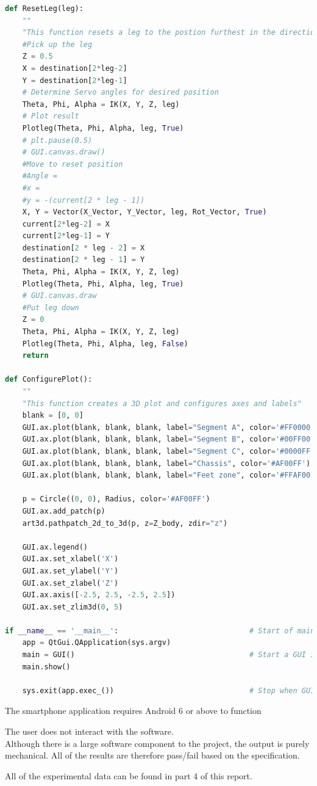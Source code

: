 \begin{lstlisting}[language = python]
def ResetLeg(leg):
    ""
    "This function resets a leg to the postion furthest in the direction of robot movement"
    #Pick up the leg
    Z = 0.5
    X = destination[2*leg-2]
    Y = destination[2*leg-1]
    # Determine Servo angles for desired position
    Theta, Phi, Alpha = IK(X, Y, Z, leg)
    # Plot result
    Plotleg(Theta, Phi, Alpha, leg, True)
    # plt.pause(0.5)
    # GUI.canvas.draw()
    #Move to reset position
    #Angle =
    #x =
    #y = -(current[2 * leg - 1])
    X, Y = Vector(X_Vector, Y_Vector, leg, Rot_Vector, True)
    current[2*leg-2] = X
    current[2*leg-1] = Y
    destination[2 * leg - 2] = X
    destination[2 * leg - 1] = Y
    Theta, Phi, Alpha = IK(X, Y, Z, leg)
    Plotleg(Theta, Phi, Alpha, leg, True)
    # GUI.canvas.draw
    #Put leg down
    Z = 0
    Theta, Phi, Alpha = IK(X, Y, Z, leg)
    Plotleg(Theta, Phi, Alpha, leg, False)
    return

def ConfigurePlot():
    ""
    "This function creates a 3D plot and configures axes and labels"
    blank = [0, 0]
    GUI.ax.plot(blank, blank, blank, label="Segment A", color='#FF0000')
    GUI.ax.plot(blank, blank, blank, label="Segment B", color='#00FF00')
    GUI.ax.plot(blank, blank, blank, label="Segment C", color='#0000FF')
    GUI.ax.plot(blank, blank, blank, label="Chassis", color='#AF00FF')
    GUI.ax.plot(blank, blank, blank, label="Feet zone", color='#FFAF00')

    p = Circle((0, 0), Radius, color='#AF00FF')
    GUI.ax.add_patch(p)
    art3d.pathpatch_2d_to_3d(p, z=Z_body, zdir="z")

    GUI.ax.legend()
    GUI.ax.set_xlabel('X')
    GUI.ax.set_ylabel('Y')
    GUI.ax.set_zlabel('Z')
    GUI.ax.axis([-2.5, 2.5, -2.5, 2.5])
    GUI.ax.set_zlim3d(0, 5)

if __name__ == '__main__':                              # Start of main application
    app = QtGui.QApplication(sys.argv)
    main = GUI()                                        # Start a GUI instance
    main.show()

    sys.exit(app.exec_())                               # Stop when GUI is closed
\end{lstlisting}

The smartphone application requires Android 6 or above to function


The user does not interact with the software.\\

Although there is a large software component to the project, the output is purely mechanical. All of the results are therefore pass/fail based on the specification.

All of the experimental data can be found in part 4 of this report.
